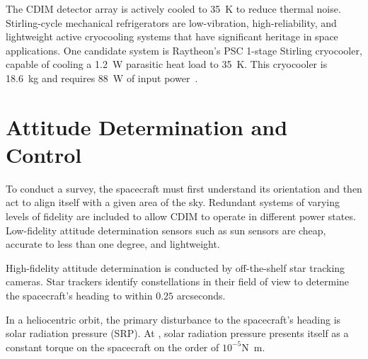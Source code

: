 \documentclass{ws-jai}
\begin{document}
The CDIM detector array is actively cooled to \SI{35}{\kelvin} to reduce thermal noise.
Stirling-cycle mechanical refrigerators are low-vibration, high-reliability, and lightweight active cryocooling systems that have significant heritage in space applications.
One candidate system is Raytheon's PSC 1-stage Stirling cryocooler, capable of cooling a \SI{1.2}{\watt} parasitic heat load to \SI{35}{\kelvin}.
This cryocooler is \SI{18.6}{\kilo\gram} and requires \SI{88}{\watt} of input power~\cite{tchandbook2003}.




\section{Attitude Determination and Control}
\label{sec:adcs}
To conduct a survey, the spacecraft must first understand its orientation and then act to align itself with a given area of the sky.
Redundant systems of varying levels of fidelity are included to allow CDIM to operate in different power states.
Low-fidelity attitude determination sensors such as sun sensors are cheap, accurate to less than one degree, and lightweight.

High-fidelity attitude determination is conducted by off-the-shelf star tracking cameras.
Star trackers identify constellations in their field of view to determine the spacecraft's heading to within $0.25$ arcseconds.

In a heliocentric orbit, the primary disturbance to the spacecraft's heading is solar radiation pressure (SRP).
At \Ltwo, solar radiation pressure presents itself as a constant torque on the spacecraft on the order of $10^{-5}$\si{\newton\meter}.
\end{document}
